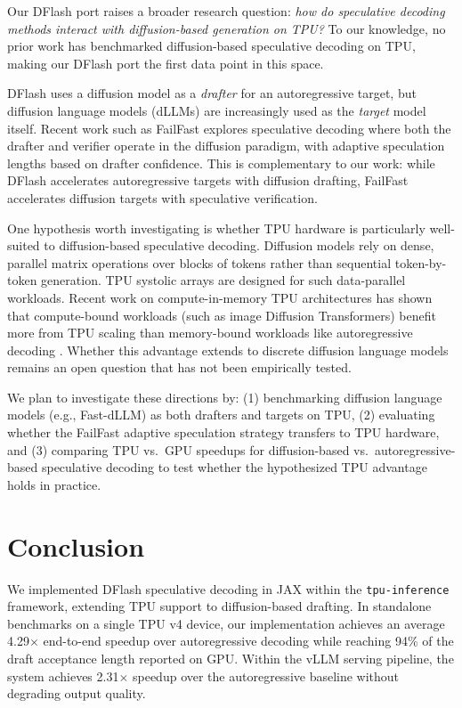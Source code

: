 \documentclass[12pt,letterpaper]{article}
\begin{document}
Our DFlash port raises a broader research question: \textit{how do speculative decoding methods interact with diffusion-based generation on TPU?} To our knowledge, no prior work has benchmarked diffusion-based speculative decoding on TPU, making our DFlash port the first data point in this space.

DFlash uses a diffusion model as a \emph{drafter} for an autoregressive target, but diffusion language models (dLLMs) are increasingly used as the \emph{target} model itself. Recent work such as FailFast \citep{pan2026failfastwinbig} explores speculative decoding where both the drafter and verifier operate in the diffusion paradigm, with adaptive speculation lengths based on drafter confidence. This is complementary to our work: while DFlash accelerates autoregressive targets with diffusion drafting, FailFast accelerates diffusion targets with speculative verification.

One hypothesis worth investigating is whether TPU hardware is particularly well-suited to diffusion-based speculative decoding. Diffusion models rely on dense, parallel matrix operations over blocks of tokens rather than sequential token-by-token generation. TPU systolic arrays are designed for such data-parallel workloads. Recent work on compute-in-memory TPU architectures has shown that compute-bound workloads (such as image Diffusion Transformers) benefit more from TPU scaling than memory-bound workloads like autoregressive decoding \citep{wang2025acceleratinglargelanguagemodel}. Whether this advantage extends to discrete diffusion language models remains an open question that has not been empirically tested.

We plan to investigate these directions by: (1) benchmarking diffusion language models (e.g., Fast-dLLM) as both drafters and targets on TPU, (2) evaluating whether the FailFast adaptive speculation strategy transfers to TPU hardware, and (3) comparing TPU vs.\ GPU speedups for diffusion-based vs.\ autoregressive-based speculative decoding to test whether the hypothesized TPU advantage holds in practice.

\section{Conclusion}

We implemented DFlash speculative decoding in JAX within the \texttt{tpu-inference} framework, extending TPU support to diffusion-based drafting. In standalone benchmarks on a single TPU v4 device, our implementation achieves an average 4.29$\times$ end-to-end speedup over autoregressive decoding while reaching 94\% of the draft acceptance length reported on GPU. Within the vLLM serving pipeline, the system achieves 2.31$\times$ speedup over the autoregressive baseline without degrading output quality.
\end{document}
